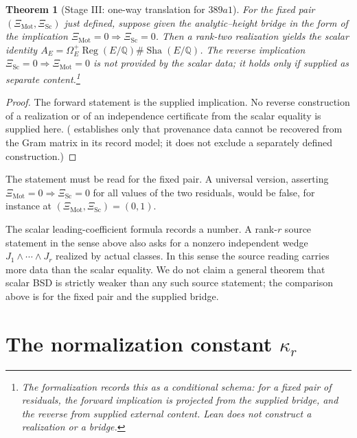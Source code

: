 \documentclass[11pt]{article}
\newtheorem{theorem}{Theorem}[section]
\theoremstyle{definition}
\newcommand{\Q}{\mathbb{Q}}
\newcommand{\Sha}{\operatorname{Sha}}
\newcommand{\Reg}{\operatorname{Reg}}
\newcommand{\kapr}{\kappa_r}
\begin{document}
\begin{theorem}[Stage III: one-way translation for $389a1$]\label{thm:apparatus:vsrc-stage-iii-translation}
For the fixed pair $(\Xi_{\mathrm{Mot}},\Xi_{\mathrm{Sc}})$ just defined,
suppose given the analytic--height bridge in the form of the implication
$\Xi_{\mathrm{Mot}}=0\Rightarrow\Xi_{\mathrm{Sc}}=0$.  Then a rank-two
realization yields the scalar identity
$A_E=\Omega_E^+\Reg(E/\Q)\#\Sha(E/\Q)$.  The reverse implication
$\Xi_{\mathrm{Sc}}=0\Rightarrow\Xi_{\mathrm{Mot}}=0$ is not provided by
the scalar data; it holds only if supplied as separate content.\footnote{The formalization records this as a conditional schema: for a
fixed pair of residuals, the forward implication is projected from the
supplied bridge, and the reverse from supplied external content.  Lean
does not construct a realization or a bridge.}
\end{theorem}

\begin{proof}
The forward statement is the supplied implication.  No reverse construction of a realization or
of an independence certificate from the scalar equality is supplied
here.  ( establishes only that
provenance data cannot be recovered from the Gram matrix in its record
model; it does not exclude a separately defined construction.)
\end{proof}

The statement must be read for the fixed pair.  A universal version,
asserting $\Xi_{\mathrm{Mot}}=0\Rightarrow\Xi_{\mathrm{Sc}}=0$ for all
values of the two residuals, would be false, for instance at
$(\Xi_{\mathrm{Mot}},\Xi_{\mathrm{Sc}})=(0,1)$.

\begin{remark}\label{rmk:apparatus:vsrc-rank-r-stronger}
The scalar leading-coefficient formula records a number.  A rank-$r$
source statement in the sense above also asks for a nonzero independent
wedge $J_1\wedge\cdots\wedge J_r$ realized by actual classes.  In this
sense the source reading carries more data than the scalar equality.  We
do not claim a general theorem that scalar BSD is strictly weaker than any
such source statement; the comparison above is for the fixed pair and the
supplied bridge.
\end{remark}
 \section[The normalization constant kappa-r]{The normalization constant $\kapr$}
\label{sec:kappa-normalization}
\end{document}
